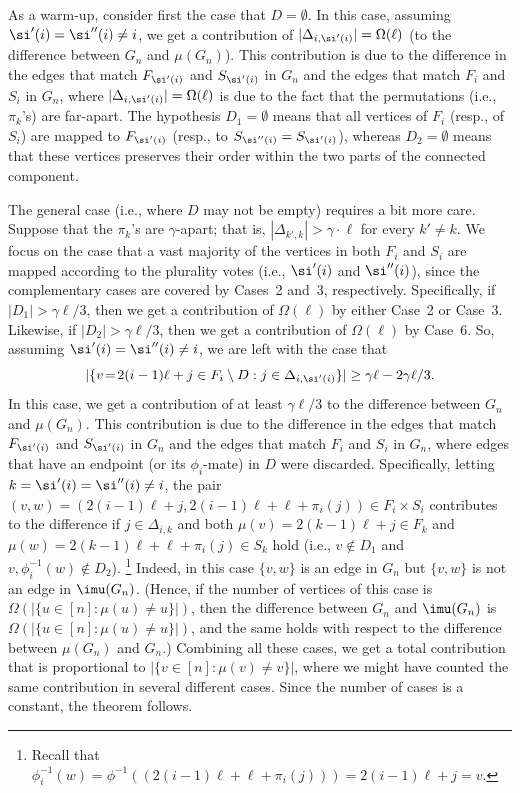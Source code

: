 As a warm-up, consider first the case that $D=\emptyset$.
%
In this case, assuming $\si'(i)=\si''(i)\neq i$,
we get a contribution of $|\Delta_{i,\si'(i)}|=\Omega(\ell)$
(to the difference between $G_n$ and $\mu(G_n)$).
This contribution is due to the difference in the edges
that match $F_{\si'(i)}$ and $S_{\si'(i)}$ in $G_n$
and the edges that match $F_i$ and $S_i$ in $G_n$,
where $|\Delta_{i,\si'(i)}|=\Omega(\ell)$ is due to
the fact that the permutations (i.e., $\pi_k$'s) are far-apart.
The hypothesis $D_1=\emptyset$ means that all vertices
of $F_i$ (resp., of $S_i$) are mapped to $F_{\si'(i)}$
(resp., to $S_{\si''(i)}=S_{\si'(i)}$),
whereas $D_2=\emptyset$ means that these vertices preserves
their order within the two parts of the connected component.

The general case (i.e., where $D$ may not be empty)
requires a bit more care.
Suppose that the $\pi_k$'s are $\gamma$-apart;
that is, $|\Delta_{k',k}|>\gamma\cdot\ell$ for every $k'\neq k$.
We focus on the case that a vast majority of the vertices in
both $F_i$ and $S_i$ are mapped according to the plurality votes
(i.e., $\si'(i)$ and $\si''(i)$), since the complementary cases
are covered by Cases~2 and~3, respectively.
Specifically, if $|D_1|>\gamma\ell/3$,
then we get a contribution of $\Omega(\ell)$ by either Case~2 or Case~3.
Likewise, if $|D_2|>\gamma\ell/3$,
then we get a contribution of $\Omega(\ell)$ by Case~6.
%
So, assuming $\si'(i)=\si''(i)\neq i$, we are left with the case that
$$|\{v\!=\!2(i-1)\ell+j\in F_i\setminus D: j\in\Delta_{i,\si'(i)}\}|
  \geq\gamma\ell-2\gamma\ell/3.$$
In this case,
%
we get a contribution of at least $\gamma\ell/3$
to the difference between $G_n$ and $\mu(G_n)$.
This contribution is due to the difference in the edges
that match $F_{\si'(i)}$ and $S_{\si'(i)}$ in $G_n$
and the edges that match $F_i$ and $S_i$ in $G_n$,
where edges that have an endpoint (or its $\phi_i$-mate)
in $D$ were discarded.
Specifically, letting $k=\si'(i)=\si''(i)\neq i$,
the pair $(v,w)=(2(i-1)\ell+j,2(i-1)\ell+\ell+\pi_i(j))\in F_i\times S_i$
contributes to the difference if $j\in\Delta_{i,k}$ and
both $\mu(v)=2(k-1)\ell+j\in F_{k}$
and $\mu(w)=2(k-1)\ell+\ell+\pi_i(j)\in S_{k}$ hold
(i.e., $v\not\in D_1$ and $v,\phi_i^{-1}(w)\not\in D_2$).
\footnote{Recall
that $\phi_i^{-1}(w)=\phi^{-1}((2(i-1)\ell+\ell+\pi_i(j)))=2(i-1)\ell+j=v$.}
%
Indeed, in this case $\{v,w\}$ is an edge in $G_n$
but $\{v,w\}$ is not an edge in $\imu(G_n)$.
%
(Hence, if the number of vertices of this case
is $\Omega(|\{u\in[n]:\mu(u)\neq u\}|)$,
then the difference between $G_n$ and $\imu(G_n)$
is $\Omega(|\{u\in[n]:\mu(u)\neq u\}|)$, and the same holds
with respect to the difference between $\mu(G_n)$ and $G_n$.)
\EDes
Combining all these cases, we get a total contribution
that is proportional to $|\{v\in[n]:\mu(v)\neq v\}|$,
where we might have counted the same contribution
in several different cases.
Since the number of cases is a constant, the theorem follows.
\EPF


